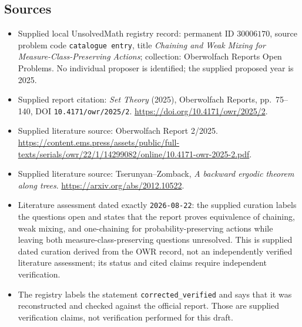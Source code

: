 \documentclass[11pt]{article}
\begin{document}
\subsection{Sources}
\begin{itemize}
\item Supplied local UnsolvedMath registry record: permanent ID \(30006170\), source problem code \texttt{catalogue entry}, title \emph{Chaining and Weak Mixing for Measure-Class-Preserving Actions}; collection: Oberwolfach Reports Open Problems. No individual proposer is identified; the supplied proposed year is 2025.
\item Supplied report citation: \emph{Set Theory} (2025), Oberwolfach Reports, pp.~75--140, DOI \texttt{10.4171/owr/2025/2}. \url{https://doi.org/10.4171/owr/2025/2}.
\item Supplied literature source: Oberwolfach Report 2/2025. \url{https://content.ems.press/assets/public/full-texts/serials/owr/22/1/14299082/online/10.4171-owr-2025-2.pdf}.
\item Supplied literature source: Tserunyan--Zomback, \emph{A backward ergodic theorem along trees}. \url{https://arxiv.org/abs/2012.10522}.
\item Literature assessment dated exactly \texttt{2026-08-22}: the supplied curation labels the questions open and states that the report proves equivalence of chaining, weak mixing, and one-chaining for probability-preserving actions while leaving both measure-class-preserving questions unresolved. This is supplied dated curation derived from the OWR record, not an independently verified literature assessment; its status and cited claims require independent verification.
\item The registry labels the statement \texttt{corrected\_verified} and says that it was reconstructed and checked against the official report. Those are supplied verification claims, not verification performed for this draft.
\end{itemize}
\end{document}
